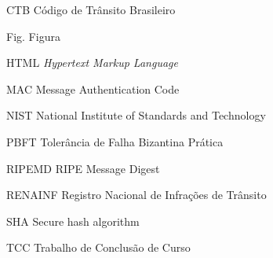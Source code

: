 \begin{siglas}
  \item[CTB] Código de Trânsito Brasileiro
  \item[Fig.] Figura
  \item[HTML] \textit{Hypertext Markup Language}
  \item[MAC] Message Authentication Code
  \item[NIST] National Institute of Standards and Technology
  \item[PBFT] Tolerância de Falha Bizantina Prática
  \item[RIPEMD] RIPE Message Digest
  \item[RENAINF] Registro Nacional de Infrações de Trânsito
  \item[SHA] Secure hash algorithm
  \item[TCC] Trabalho de Conclusão de Curso
\end{siglas}
